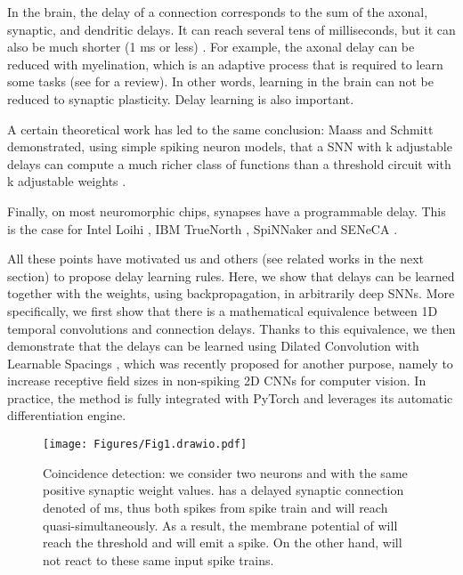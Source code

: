 \documentclass{article} \usepackage{iclr2024_conference,times}
\begin{document}
In the brain, the delay of a connection corresponds to the sum of the axonal, synaptic, and dendritic delays. It can reach several tens of milliseconds, but it can also be much shorter (1 ms or less) \citep{Izhikevich2006}. For example, the axonal delay can be reduced with myelination, which is an adaptive process that is required to learn some tasks (see \citet{Bowers2017a} for a review). In other words, learning in the brain can not be reduced to synaptic plasticity. Delay learning is also important.

A certain theoretical work has led to the same conclusion: Maass and Schmitt demonstrated, using simple spiking neuron models, that a SNN with k adjustable delays can compute a much richer class of functions than a threshold circuit with k adjustable weights \citep{Maass1999}.

Finally, on most neuromorphic chips, synapses have a programmable delay. This is the case for Intel Loihi \citep{Davies2018}, IBM TrueNorth \citep{Akopyan2015}, SpiNNaker \citep{Furber2014} and SENeCA \citep{Yousefzadeh2022}.

All these points have motivated us and others (see related works in the next section) to propose delay learning rules. Here, we show that delays can be learned together with the weights, using backpropagation, in arbitrarily deep SNNs. More specifically, we first show that there is a mathematical equivalence between 1D temporal convolutions and connection delays. Thanks to this equivalence, we then demonstrate that the delays can be learned using Dilated Convolution with Learnable Spacings \citep{hassani2023dilated, khalfaouihassani2023dilated}, which was recently proposed for another purpose, namely to increase receptive field sizes in non-spiking 2D CNNs for computer vision. In practice, the method is fully integrated with PyTorch and leverages its automatic differentiation engine.

\begin{figure}[ht]
  \centering
  \texttt{[image: Figures/Fig1.drawio.pdf]}
  \caption{Coincidence detection: we consider two neurons  and  with the same positive synaptic weight values.  has a delayed synaptic connection denoted  of ms, thus both spikes from spike train  and  will reach  quasi-simultaneously. As a result, the membrane potential of  will reach the threshold  and  will emit a spike. On the other hand,  will not react to these same input spike trains. }
\label{fig:coincidence_detection}
\end{figure}
\end{document}
